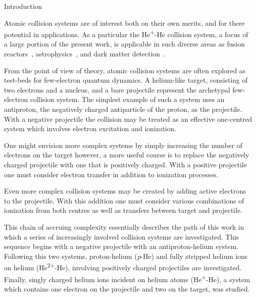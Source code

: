 \documentclass[letterpaper, 11 pt]{report}
\begin{document}
\singlespacing

\setcounter{page}{3}

\cleardoublepage
{}
{}
\tableofcontents

\cleardoublepage
{}
{}
\listoftables

\cleardoublepage
{}
{}
\listoffigures

\newpage


\onehalfspacing  %

\begin{chapter}{Introduction \label{chap:intro}}

   Atomic collision systems are of interest both on their own merits, and for there potential in
   applications. As a  particular the He\textsuperscript{+}-He collision system, a focus of a large
   portion of the present work, is applicable in such diverse areas as fusion reactors~\cite{fusion1,
   fusion2}, astrophysics~\cite{astro1, astro2}, and dark matter detection~\cite{dmdet}.

   From the point of view of theory, atomic collision systems are often explored as test-beds for
   few-electron quantum dynamics. A helium-like target, consisting of two electrons and a nucleus, and a
   bare projectile represent the archetypal few-electron collision system. The simplest example of such
   a system uses an antiproton, the negatively charged antiparticle of the proton, as the projectile.
   With a negative projectile the collision may be treated as an effective one-centred system which
   involves electron excitation and ionization.

   One might envision more complex systems by simply increasing the number of electrons on the target
   however, a more useful course is to replace the negatively charged projectile with one that is
   positively charged. With a positive projectile one must consider electron transfer in addition to
   ionization processes.

   Even more complex collision systems may be created by adding active electrons to the projectile. With
   this addition one must consider various combinations of ionization from both centres as well as
   transfers between target and projectile.

   This chain of accruing complexity essentially describes the path of this work in which a series of
   increasingly involved collision systems are investigated. This sequence begins with a negative
   projectile with an antiproton-helium system. Following this two systems, proton-helium
   (\textit{p}-He) and fully stripped helium ions on helium (He\textsuperscript{2+}-He), involving
   positively charged projectiles are investigated. Finally, singly charged helium ions incident on
   helium atoms (He\textsuperscript{+}-He), a system which contains one electron on the projectile and
   two on the target, was studied.


\end{chapter}
\end{document}
